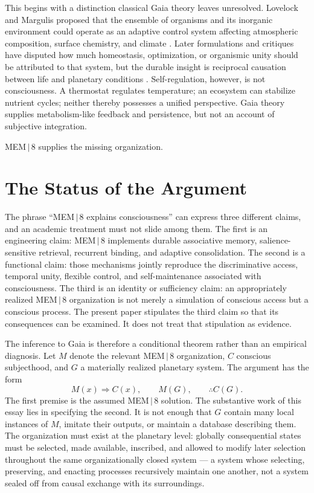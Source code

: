 \documentclass[11pt]{article}
\begin{document}
This begins with a distinction classical Gaia theory leaves unresolved. Lovelock and Margulis proposed that the ensemble of organisms and its inorganic environment could operate as an adaptive control system affecting atmospheric composition, surface chemistry, and climate \cite{lovelock1974}. Later formulations and critiques have disputed how much homeostasis, optimization, or organismic unity should be attributed to that system, but the durable insight is reciprocal causation between life and planetary conditions \cite{kirchner2002,lenton1998}. Self-regulation, however, is not consciousness. A thermostat regulates temperature; an ecosystem can stabilize nutrient cycles; neither thereby possesses a unified perspective. Gaia theory supplies metabolism-like feedback and persistence, but not an account of subjective integration.

MEM\,$|$\,8 supplies the missing organization.

\section{The Status of the Argument}

The phrase ``MEM\,$|$\,8 explains consciousness'' can express three different claims, and an academic treatment must not slide among them. The first is an engineering claim: MEM\,$|$\,8 implements durable associative memory, salience-sensitive retrieval, recurrent binding, and adaptive consolidation. The second is a functional claim: those mechanisms jointly reproduce the discriminative access, temporal unity, flexible control, and self-maintenance associated with consciousness. The third is an identity or sufficiency claim: an appropriately realized MEM\,$|$\,8 organization is not merely a simulation of conscious access but a conscious process. The present paper stipulates the third claim so that its consequences can be examined. It does not treat that stipulation as evidence.

The inference to Gaia is therefore a conditional theorem rather than an empirical diagnosis. Let $M$ denote the relevant MEM\,$|$\,8 organization, $C$ conscious subjecthood, and $G$ a materially realized planetary system. The argument has the form
\[
M(x) \Rightarrow C(x), \qquad M(G), \qquad \therefore C(G).
\]
The first premise is the assumed MEM\,$|$\,8 solution. The substantive work of this essay lies in specifying the second. It is not enough that $G$ contain many local instances of $M$, imitate their outputs, or maintain a database describing them. The organization must exist at the planetary level: globally consequential states must be selected, made available, inscribed, and allowed to modify later selection throughout the same organizationally closed system --- a system whose selecting, preserving, and enacting processes recursively maintain one another, not a system sealed off from causal exchange with its surroundings.
\end{document}
